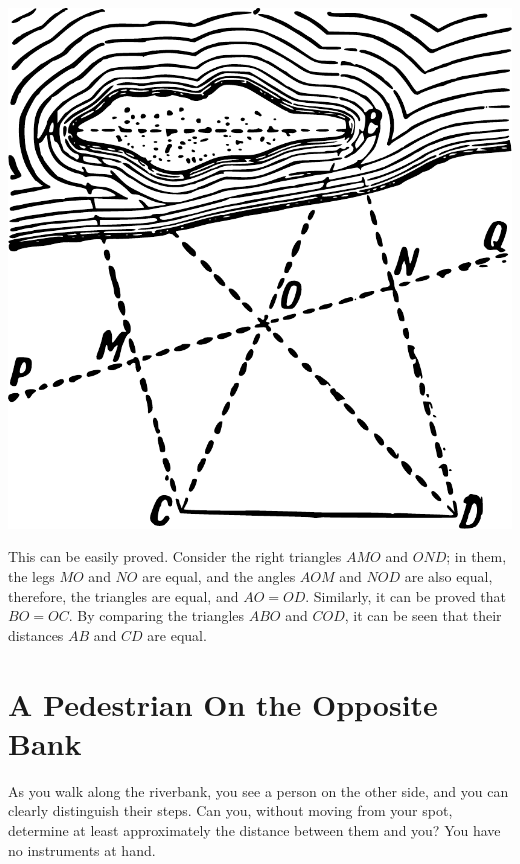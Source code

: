 \begin{marginfigure}[-3cm]%
\centering
\includegraphics[width=\textwidth]{figures/ch-02/fig-035.pdf}
\end{marginfigure}

This can be easily proved. Consider the right triangles $AMO$ and $OND$; in them, the legs $MO$ and $NO$ are equal, and the angles $AOM$ and $NOD$ are also equal, therefore, the triangles are equal, and $AO = OD$. Similarly, it can be proved that $BO = OC$. By comparing the triangles $ABO$ and $COD$, it can be seen that their distances $AB$ and $CD$ are equal.

\section{A Pedestrian On the Opposite Bank}
\label{sec-2.4}

\ques As you walk along the riverbank, you see a person on the other side, and you can clearly distinguish their steps. Can you, without moving from your spot, determine at least approximately the distance between them and you? You have no instruments at hand.

